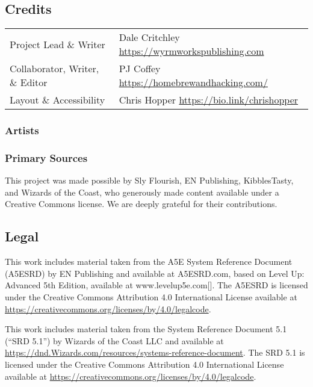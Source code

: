 \subsection{Credits}\label{_credits}

\begin{longtable}[]{@{}
  >{\raggedright\arraybackslash}p{}
  >{\raggedright\arraybackslash}p{}@{}}
\toprule\noalign{}
\endhead
\bottomrule\noalign{}
\endlastfoot
Project Lead \& Writer & Dale Critchley
\url{https://wyrmworkspublishing.com} \\
Collaborator, Writer, \& Editor & PJ Coffey
\url{https://homebrewandhacking.com/} \\
Layout \& Accessibility & Chris Hopper
\url{https://bio.link/chrishopper} \\
\end{longtable}

\subsubsection{Artists}\label{_artists}

\subsubsection{Primary Sources}\label{_primary_sources}

This project was made possible by Sly Flourish, EN Publishing,
KibblesTasty, and Wizards of the Coast, who generously made content
available under a Creative Commons license. We are deeply grateful for
their contributions.

\subsection{Legal}\label{_legal}

This work includes material taken from the A5E System Reference Document
(A5ESRD) by EN Publishing and available at A5ESRD.com, based on Level
Up: Advanced 5th Edition, available at www.levelup5e.com{[}{]}. The
A5ESRD is licensed under the Creative Commons Attribution 4.0
International License available at
\url{https://creativecommons.org/licenses/by/4.0/legalcode}.

This work includes material taken from the System Reference Document 5.1
(``SRD 5.1'') by Wizards of the Coast LLC and available at
\url{https://dnd.Wizards.com/resources/systems-reference-document}. The
SRD 5.1 is licensed under the Creative Commons Attribution 4.0
International License available at
\url{https://creativecommons.org/licenses/by/4.0/legalcode}.

